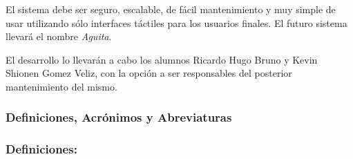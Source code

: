 El sistema debe ser seguro, escalable, de fácil mantenimiento y muy simple de usar utilizando sólo interfaces táctiles para los usuarios finales. El futuro sistema llevará el nombre \emph{Aguita}.

El desarrollo lo llevarán a cabo los alumnos Ricardo Hugo Bruno y Kevin Shionen Gomez Veliz, con la opción a ser responsables del posterior mantenimiento del mismo.

    \subsubsection{Definiciones, Acrónimos y Abreviaturas}
    \subsubsection{Definiciones:}
  
